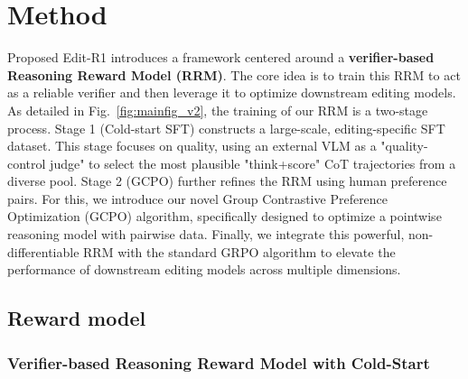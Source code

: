 \section{Method}

Proposed Edit-R1 introduces a framework centered around a \textbf{verifier-based Reasoning Reward Model (RRM)}. 
The core idea is to train this RRM to act as a reliable verifier and then leverage it to optimize downstream editing models. 
As detailed in Fig.~\ref{fig:mainfig_v2}, the training of our RRM is a two-stage process. 
Stage 1 (Cold-start SFT) constructs a large-scale, editing-specific SFT dataset. This stage focuses on quality, using an external VLM as a "quality-control judge" to select the most plausible "think+score" CoT trajectories from a diverse pool.
Stage 2 (GCPO) further refines the RRM using human preference pairs. For this, we introduce our novel Group Contrastive Preference Optimization (GCPO) algorithm, specifically designed to optimize a pointwise reasoning model with pairwise data. 
Finally, we integrate this powerful, non-differentiable RRM with the standard GRPO algorithm to elevate the performance of downstream editing models across multiple dimensions.




\subsection{Reward model}

\subsubsection{Verifier-based Reasoning Reward Model with Cold-Start}
\label{sec:cold_start_reward}

